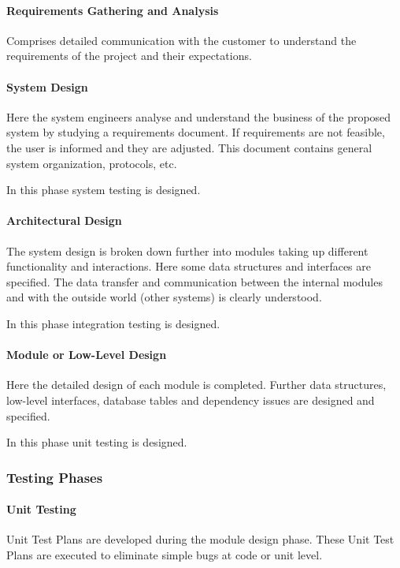 \documentclass[main.tex]{subfiles}
\begin{document}
\paragraph{Requirements Gathering and Analysis}
Comprises detailed communication with the customer to understand the requirements of the project and their expectations.\supercite{vmodel-geeksforgeeks}

\paragraph{System Design}
Here the system engineers analyse and understand the business of the proposed system by studying a requirements document.\supercite{vmodel-wikipedia} If requirements are not feasible, the user is informed and they are adjusted. This document contains general system organization, protocols, etc.

In this phase system testing is designed.

\paragraph{Architectural Design}
The system design is broken down further into modules taking up different functionality and interactions. Here some data structures and interfaces are specified. The data transfer and communication between the internal modules and with the outside world (other systems) is clearly understood.

In this phase integration testing is designed.

\paragraph{Module or Low-Level Design} Here the detailed design of each module is completed. Further data structures, low-level interfaces, database tables and dependency issues are designed and specified.

In this phase unit testing is designed.

\subsubsection{Testing Phases}

\paragraph{Unit Testing}
Unit Test Plans are developed during the module design phase. These Unit Test Plans are executed to eliminate simple bugs at code or unit level.
\end{document}
